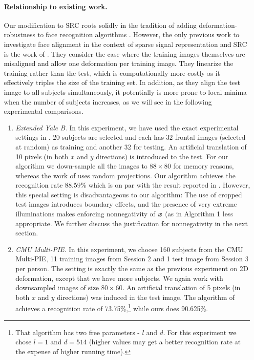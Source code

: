 \documentclass[10pt,twocolumn,letterpaper]{article}
\begin{document}
\paragraph{Relationship to existing work.} 
Our modification to SRC roots solidly in the tradition of adding deformation-robustness to face recognition algorithms \cite{Cootes2001-PAMI,Gross2006-PAMI,Wiskott1997-PAMI}. However, the only previous work to investigate face alignment in the context of sparse signal representation and SRC is the work of \cite{Huang2008-CVPR}. They consider the case where the training images themselves are misaligned and allow one deformation per training image. They linearize the training rather than the test, which is computationally more costly as it effectively triples the size of the training set. In addition, as they align the test image to all subjects simultaneously, it potentially is more prone to local minima when the number of subjects increases, as we will see in the following experimental comparisons. \vspace{-1mm}
\begin{enumerate}
\item {\em Extended Yale B.} In this experiment, we have used the exact experimental settings in \cite{Huang2008-CVPR}. 
20 subjects are selected and each has 32 frontal images (selected at random) as training and another 32 for testing. An artificial translation
of 10 pixels (in both $x$ and $y$ directions) is introduced to the test. For our algorithm we down-sample all the images
to $88\times 80$ for memory reasons, whereas the work of \cite{Huang2008-CVPR} uses random projections. Our algorithm achieves the recognition rate 88.59\% which is on par with the result reported in \cite{Huang2008-CVPR}.
However, this special setting is disadvantageous to our algorithm: The use of cropped test images introduces boundary effects, and the presence of very extreme illuminations makes enforcing nonnegativity of ${\boldsymbol{x}}$ (as in Algorithm 1 less appropriate. We further discuss the justification for nonnegativity in the next section.\vspace{-2mm}
\item {\em CMU Multi-PIE.} In this experiment, we choose 160 subjects from the CMU Multi-PIE, 11 training images from Session 2
and 1 test image from Session 3 per person. The setting is exactly the same as the previous experiment on 2D deformation, 
except that we have more subjects. We again 
work with downsampled images of size $80\times 60$. An artificial translation of 5 
pixels (in both $x$ and $y$ directions) was induced in the test image. The algorithm of \cite{Huang2008-CVPR} achieves
a recognition rate of 73.75\%,\footnote{That algorithm has two free parameters - $l$ and $d$. For this experiment we chose 
$l = 1$ and $d = 514$ (higher values may get a better recognition rate at the expense of higher running time).
} while ours does 90.625\%. \end{enumerate}\vspace{-4mm}
				
\end{document}
